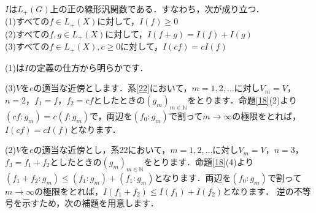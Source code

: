 \begin{yprop}\label{23}
$I$は$L_{+}(G)$上の正の線形汎関数である．すなわち，次が成り立つ． \\
(1)すべての$f \in L_{+}(X)$に対して，$I(f) \ge 0$\\
(2)すべての$f,g \in L_{+}(X)$に対して，$I(f+g)=I(f)+I(g)$\\
(3)すべての$f \in L_{+}(X), c \ge 0$に対して，$I(cf)=cI(f)$
\end{yprop}
\begin{Proof}
(1)は$I$の定義の仕方から明らかです．

(3)$V$を$e$の適当な近傍とします．系\ref{22}において，$m=1,2,\ldots$に対し$V_m=V$，$n=2$，$f_1=f$，$f_2=cf$としたときの$(g_m)_{m \in \mathbb{N}}$をとります．命題\ref{18}(2)より$(cf : g_m)=c(f : g_m)$で，両辺を$(f_0 : g_m)$で割って$m \to \infty$の極限をとれば，$I(cf)=cI(f)$となります．

(2)$V$を$e$の適当な近傍とし，系22において，$m=1,2,\ldots$に対し$V_m=V$，$n=3$，$f_3=f_1+f_2$としたときの$(g_m)_{m \in \mathbb{N}}$をとります．命題\ref{18}(4)より$(f_{1}+f_{2} : g_m ) \le (f_1 : g_m )+(f_1 : g_m)$となります．両辺を$(f_0 : g_m)$で割って$m \to \infty$の極限をとれば，$I(f_1+f_2) \le I(f_1)+I(f_2)$となります．
逆の不等号を示すため，次の補題を用意します．


\end{Proof}
